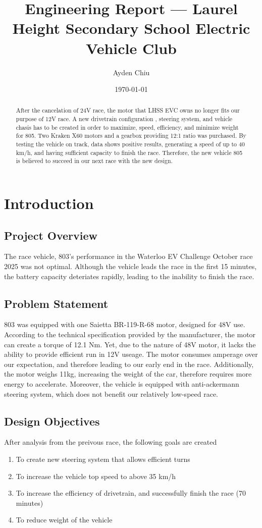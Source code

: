 \documentclass[12pt]{article}
\title{Engineering Report --- Laurel Height Secondary School 
Electric Vehicle Club}
\author{Ayden Chiu}
\date{\today}
\begin{document}
\maketitle

\begin{abstract}
After the cancelation of 24V race, the motor that LHSS
EVC owns no longer fits our purpose of 12V race. A new drivetrain configuration
, steering system, and vehicle chasis has to be created in order to maximize, 
speed, efficiency, and minimize weight for 805. 
Two Kraken X60 motors and a gearbox providing 12:1 ratio
was purchased. By testing the vehicle on track, data shows positive results,
generating a speed of up to 40 km/h, and having 
sufficient capacity to finish the race. Therefore, 
the new vehicle 805 is believed to succeed in our next race with the new design.
\end{abstract}

\section{Introduction}

\subsection{Project Overview}
The race vehicle, 803's performance in the Waterloo EV Challenge October race 2025
was not optimal. Although the vehicle leads the race 
in the first 15 minutes, the battery capacity deteriates 
rapidly, leading to the inability to finish the race.

\subsection{Problem Statement}
803 was equipped with one Saietta BR-119-R-68 motor,
designed for 48V use. According to the technical specification
provided by the manufacturer, the motor can create a torque of 12.1 Nm.
Yet, due to the nature of 48V motor, it lacks the ability to 
provide efficient run in 12V useage. The motor consumes 
amperage over our expectation, and therefore leading to our
early end in the race. Additionally, the motor weighs 11kg,
increasing the weight of the car, therefore requires more
energy to accelerate. Moreover, the vehicle is equipped with
anti-ackermann steering system, which does not benefit our
relatively low-speed race.  

\subsection{Design Objectives}
After analysis from the preivous race, the following goals are created
\begin{enumerate}
  \item To create new steering system that allows efficient turns
  \item To increase the vehicle top speed to above 35 km/h
  \item To increase the efficiency of drivetrain, and successfully finish the race (70 minutes)
  \item To reduce weight of the vehicle
\end{enumerate}
\end{document}

